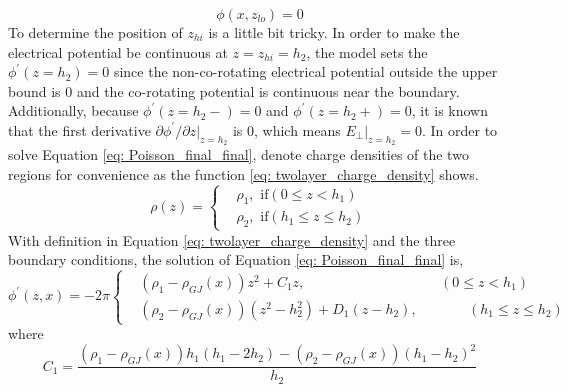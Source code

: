 \documentclass[12pt]{report}
\begin{document}
    \begin{equation}
      \label{eq: lower_boundary}
      \phi \left(x, z_{lo}\right) = 0
    \end{equation}
    To determine the position of $z_{hi}$ is a little bit tricky. In order to make the electrical 
    potential be continuous at $z = z_{hi} = h_2$, the model sets the 
    $\phi^{\prime}\left(z=h_{2}\right) = 0$ since the non-co-rotating electrical potential 
    outside the upper bound is $0$ and the co-rotating potential is continuous near the 
    boundary. Additionally, because $\phi^{\prime}\left(z=h_{2}-\right) = 0$
    and $\phi^{\prime}\left(z=h_{2}+\right) = 0$, it is known that the first derivative 
    $\partial{\phi^{\prime}}/\partial{z}\vert_{z=h_{2}}$ is $0$, which means 
    $E_{\perp}\vert_{z=h_{2}} = 0$. In order to solve Equation \ref{eq: Poisson_final_final}, 
    denote charge densities of the two regions for convenience as the function 
    \ref{eq: twolayer_charge_density} shows.
    \begin{equation}
      \label{eq: twolayer_charge_density}
        \rho\left(z\right) = 
        \begin{cases}
          & \rho_{1} , \text{    if} \left(0 \leq z < h_{1}\right)\\
          & \rho_{2} , \text{    if} \left(h_{1} \leq z \leq h_{2}\right) 
        \end{cases}       
    \end{equation}
    With definition in Equation \ref{eq: twolayer_charge_density} and the three boundary 
    conditions, the solution of Equation \ref{eq: Poisson_final_final} is, 
    \begin{equation}
      \label{eq: twolayer_potential}
        \phi^{\prime}\left(z, x\right) = -2\pi
        \left\{\begin{alignedat}{2}
          & \left(\rho_{1} - \rho_{GJ}\left(x\right)\right)z^2 + C_{1} z ,  &&\left(0 \leq z < h_{1}\right)\\
          & \left(\rho_{2}-\rho_{GJ}\left(x\right)\right)\left(z^2 - h_2^2\right) + D_{1} \left(z-h_2\right),  &&\qquad \left(h_{1} \leq z \leq h_{2}\right) 
        \end{alignedat}\right.
    \end{equation}
    where 
    \begin{equation*}
      C_{1} = \frac{\left(\rho_{1}-\rho_{GJ}\left(x\right)\right)h_1\left(h_1-2h_2\right)-\left(\rho_2-\rho_{GJ}\left(x\right)\right)\left(h_1-h_2\right)^2}{h_2} 
    \end{equation*}
\end{document}
